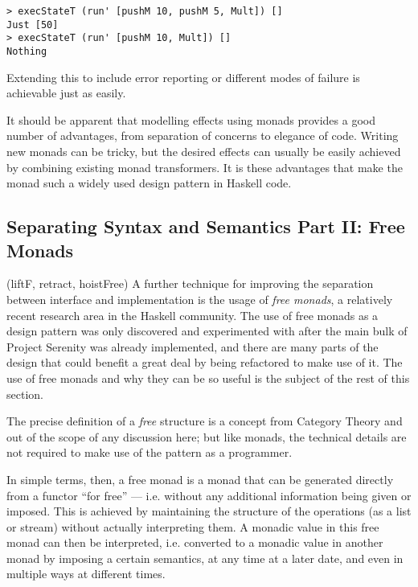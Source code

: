 \begin{verbatim}
> execStateT (run' [pushM 10, pushM 5, Mult]) []
Just [50]
> execStateT (run' [pushM 10, Mult]) []
Nothing
\end{verbatim}

\noindent Extending this to include error reporting or different modes of failure is achievable just as easily.

It should be apparent that modelling effects using monads provides a good number of advantages, from separation of concerns to elegance of code. Writing new monads can be tricky, but the desired effects can usually be easily achieved by combining existing monad transformers. It is these advantages that make the monad such a widely used design pattern in Haskell code.

\subsection{Separating Syntax and Semantics Part II: Free Monads}
\label{ssec:freemonads}

\functions(liftF, retract, hoistFree)
A further technique for improving the separation between interface and implementation is the usage of \emph{free monads}, a relatively recent research area in the Haskell community. 
The use of free monads as a design pattern was only discovered and experimented with after the main bulk of Project Serenity was already implemented, and there are many parts of the design that could benefit a great deal by being refactored to make use of it. The use of free monads and why they can be so useful is the subject of the rest of this section.

The precise definition of a \emph{free} structure is a concept from Category Theory and out of the scope of any discussion here; but like monads, the technical details are not required to make use of the pattern as a programmer.

In simple terms, then, a free monad is a monad that can be generated directly from a functor ``for free'' --- i.e. without any additional information being given or imposed. This is achieved by maintaining the structure of the operations (as a list or stream) without actually interpreting them. A monadic value in this free monad can then be interpreted, i.e. converted to a monadic value in another monad by imposing a certain semantics, at any time at a later date, and even in multiple ways at different times.


